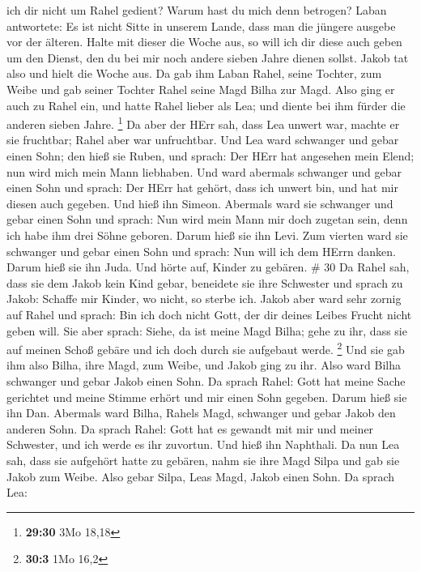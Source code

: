 ich dir nicht um Rahel gedient? Warum hast du mich denn betrogen?
 Laban antwortete: Es ist nicht Sitte in unserem Lande,
dass man die jüngere ausgebe vor der älteren.  Halte mit
dieser die Woche aus, so will ich dir diese auch geben um den Dienst,
den du bei mir noch andere sieben Jahre dienen sollst. 
Jakob tat also und hielt die Woche aus. Da gab ihm Laban Rahel, seine
Tochter, zum Weibe  und gab seiner Tochter Rahel seine Magd
Bilha zur Magd.  Also ging er auch zu Rahel ein, und hatte
Rahel lieber als Lea; und diente bei ihm fürder die anderen sieben
Jahre. \footnote{\textbf{29:30} 3Mo 18,18}  Da aber der
HErr sah, dass Lea unwert war, machte er sie fruchtbar; Rahel aber war
unfruchtbar.  Und Lea ward schwanger und gebar einen Sohn;
den hieß sie Ruben, und sprach: Der HErr hat angesehen mein Elend; nun
wird mich mein Mann liebhaben.  Und ward abermals schwanger
und gebar einen Sohn und sprach: Der HErr hat gehört, dass ich unwert
bin, und hat mir diesen auch gegeben. Und hieß ihn Simeon. 
Abermals ward sie schwanger und gebar einen Sohn und sprach: Nun wird
mein Mann mir doch zugetan sein, denn ich habe ihm drei Söhne geboren.
Darum hieß sie ihn Levi.  Zum vierten ward sie schwanger
und gebar einen Sohn und sprach: Nun will ich dem HErrn danken. Darum
hieß sie ihn Juda. Und hörte auf, Kinder zu gebären. \# 30 
Da Rahel sah, dass sie dem Jakob kein Kind gebar, beneidete sie ihre
Schwester und sprach zu Jakob: Schaffe mir Kinder, wo nicht, so sterbe
ich.  Jakob aber ward sehr zornig auf Rahel und sprach: Bin
ich doch nicht Gott, der dir deines Leibes Frucht nicht geben will.
 Sie aber sprach: Siehe, da ist meine Magd Bilha; gehe zu
ihr, dass sie auf meinen Schoß gebäre und ich doch durch sie aufgebaut
werde. \footnote{\textbf{30:3} 1Mo 16,2}  Und sie gab ihm
also Bilha, ihre Magd, zum Weibe, und Jakob ging zu ihr. 
Also ward Bilha schwanger und gebar Jakob einen Sohn.  Da
sprach Rahel: Gott hat meine Sache gerichtet und meine Stimme erhört und
mir einen Sohn gegeben. Darum hieß sie ihn Dan.  Abermals
ward Bilha, Rahels Magd, schwanger und gebar Jakob den anderen Sohn.
 Da sprach Rahel: Gott hat es gewandt mit mir und meiner
Schwester, und ich werde es ihr zuvortun. Und hieß ihn Naphthali.
 Da nun Lea sah, dass sie aufgehört hatte zu gebären, nahm
sie ihre Magd Silpa und gab sie Jakob zum Weibe.  Also
gebar Silpa, Leas Magd, Jakob einen Sohn.  Da sprach Lea:
